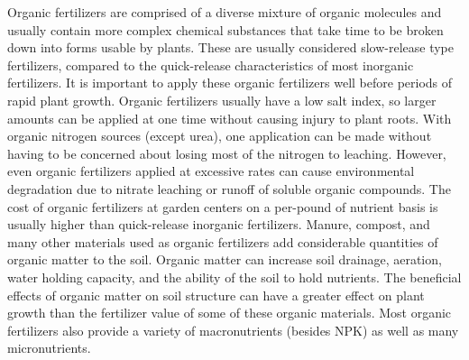 \documentclass[
  letterpaper,
  twocolumn,
  portrait]{scrbook}
\begin{document}
Organic fertilizers are comprised of a diverse mixture of organic
molecules and usually contain more complex chemical substances that take
time to be broken down into forms usable by plants. These are usually
considered slow-release type fertilizers, compared to the quick-release
characteristics of most inorganic fertilizers. It is important to apply
these organic fertilizers well before periods of rapid plant growth.
Organic fertilizers usually have a low salt index, so larger amounts can
be applied at one time without causing injury to plant roots. With
organic nitrogen sources (except urea), one application can be made
without having to be concerned about losing most of the nitrogen to
leaching. However, even organic fertilizers applied at excessive rates
can cause environmental degradation due to nitrate leaching or runoff of
soluble organic compounds. The cost of organic fertilizers at garden
centers on a per-pound of nutrient basis is usually higher than
quick-release inorganic fertilizers. Manure, compost, and many other
materials used as organic fertilizers add considerable quantities of
organic matter to the soil. Organic matter can increase soil drainage,
aeration, water holding capacity, and the ability of the soil to hold
nutrients. The beneficial effects of organic matter on soil structure
can have a greater effect on plant growth than the fertilizer value of
some of these organic materials. Most organic fertilizers also provide a
variety of macronutrients (besides NPK) as well as many micronutrients.

 
  \providecommand{\huxb}[2]{\arrayrulecolor[RGB]{#1}\global\arrayrulewidth=#2pt}
  \providecommand{\huxvb}[2]{\color[RGB]{#1}\vrule width #2pt}
  \providecommand{\huxtpad}[1]{\rule{0pt}{#1}}
  \providecommand{\huxbpad}[1]{\rule[-#1]{0pt}{#1}}
\end{document}
